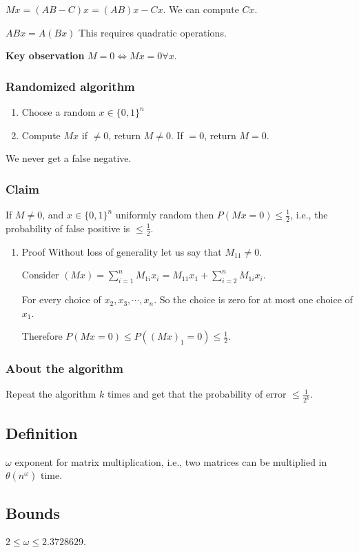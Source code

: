 \documentclass[11pt]{article}
\begin{document}
\(Mx = (AB - C)x = (AB)x - Cx\). We can compute \(Cx\).

\(ABx = A(Bx)\) This requires quadratic operations.

\textbf{Key observation} \(M = 0 \iff Mx = 0 \forall x\).
\subsubsection{Randomized algorithm}
\label{sec:org11ca7f6}
\begin{enumerate}
\item Choose a random \(x \in \{0, 1\}^n\)
\item Compute \(Mx\) if \(\neq 0\), return \(M \neq 0\). If \(= 0\), return \(M = 0\).
\end{enumerate}

We never get a false negative.
\subsubsection{Claim}
\label{sec:orge44eb81}
If \(M \neq 0\), and \(x \in \{0, 1\}^n\) uniformly random then \(P(Mx = 0) \le
    \frac{1}{2}\), i.e., the probability of false positive is \(\le \frac12\).
\begin{enumerate}
\item Proof
\label{sec:org8b389de}
Without loss of generality let us say that \(M_{11} \neq 0\).

Consider \((Mx) = \sum_{i=1}^{n} M_{1i} x_i = M_{11} x_1 + \sum_{i=2}^{n}
     M_{1i}x_i\).

For every choice of \(x_2, x_3, \cdots, x_n\). So the choice is zero for at
most one choice of \(x_1\).

Therefore \(P(Mx = 0) \le P((Mx)_1 = 0) \le \frac{1}{2}\).
\end{enumerate}
\subsubsection{About the algorithm}
\label{sec:orgb3fd6a3}
Repeat the algorithm \(k\) times and get that the probability of error \(\le
    \frac{1}{2^k}\).
\subsection{Definition}
\label{sec:orgb49bee0}
\(\omega\) exponent for matrix multiplication, i.e., two matrices can be
multiplied in \(\theta(n^\omega)\) time.
\subsection{Bounds}
\label{sec:org14cc184}
\(2 \le \omega \le 2.3728629\).
\end{document}
